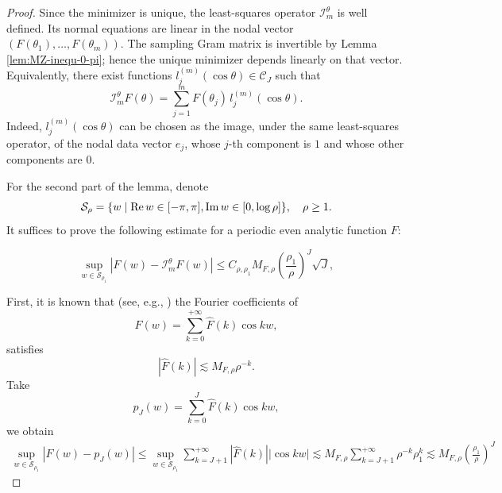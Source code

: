 \documentclass{article}
\numberwithin{equation}{section}
\def\lt{\left}
\def\rt{\right}
\begin{document}
\begin{proof}
    Since the minimizer is unique, the least-squares operator $\mathcal{I}_m^\theta$ is well defined. Its normal equations are linear in the nodal vector
    \(
    (F(\theta_1),\ldots,F(\theta_m)).
    \)
    The sampling Gram matrix is invertible by Lemma \ref{lem:MZ-inequ-0-pi}; hence the unique minimizer depends linearly on that vector.
    Equivalently, there exist functions \(l_j^{(m)}(\cos\theta)\in \mathcal C_J\) such that
    \[
    \mathcal I_m^\theta F(\theta)
    =
    \sum_{j=1}^m F(\theta_j)\,l_j^{(m)}(\cos\theta).
    \]
    Indeed, \(l_j^{(m)}(\cos\theta)\) can be chosen as the image, under the same least-squares operator, of the nodal data vector \(e_j\), whose \(j\)-th component is \(1\) and whose other components are \(0\). 

    For the second part of the lemma, denote
    $$\mathcal{S}_\rho = \{w\mid {\rm Re}\,w\in [-\pi,\pi], {\rm Im}\,w\in[0,\log\rho]\},\quad \rho\geq 1.$$
    It suffices to prove the following estimate for a periodic even analytic function $F$:

    \begin{equation}
        \sup_{w\in \mathcal{S}_{\rho_1}} |F(w)-\mathcal I_m^\theta F(w)|\leq C_{\rho,\rho_1}M_{F,\rho}  \lt(\frac{\rho_1}{\rho}\rt)^J \sqrt J,
    \end{equation}

    First, it is known that (see, e.g., \cite[Chapter 7.8]{devore1993constructive}) the Fourier coefficients of
    $$ F(w) = \sum_{k=0}^{+\infty} \hat F(k)\cos kw,$$  
    satisfies
    $$ |\hat{F}(k)|\lesssim M_{F,\rho}\rho^{-k}.$$
    Take \begin{equation}\label{eqn:optimal-pj}
        p_J(w) = \sum_{k=0}^J \hat F(k)\cos kw,
    \end{equation}
    we obtain \begin{equation}\label{eqn:optimal-approx}
    \begin{split}
        \sup_{w\in \mathcal{S}_{\rho_1}} |F(w)-p_J(w)| \leq \sup_{w\in \mathcal{S}_{\rho_1}} \sum_{k=J+1}^{+\infty} |\hat F(k)||\cos kw|\lesssim M_{F,\rho}\sum_{k=J+1}^{+\infty} \rho^{-k}\rho_1^k \lesssim M_{F,\rho}\lt( \frac{\rho_1}{\rho} \rt)^J
    \end{split} 
    \end{equation} 


\end{proof}
\end{document}

